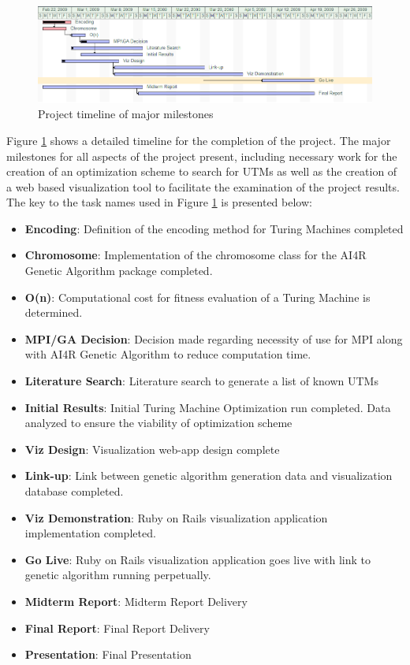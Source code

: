 \begin{figure}[htp]
\centering
\includegraphics[width=1\textwidth]{images/gantt.png}
\caption{Project timeline of major milestones}\label{fig:gantt}
\end{figure}
Figure \ref{fig:gantt} shows a detailed timeline for the completion of the project. The major milestones for all aspects of the project present, including necessary work for the creation of an optimization scheme to search for UTMs as well as the creation of a web based visualization tool to facilitate the examination of the project results. The key to the task names used in Figure \ref{fig:gantt} is presented below: 
\begin{itemize}
	\item {\bf Encoding}:	Definition of the encoding method for Turing Machines completed
	\item {\bf Chromosome}: Implementation of the chromosome class for the AI4R Genetic Algorithm package completed.
	\item {\bf O(n)}:	Computational cost for fitness evaluation of a Turing Machine is determined.
	\item {\bf MPI/GA Decision}:	Decision made regarding necessity of use for MPI along with AI4R\nocite{AI4Rmanual} Genetic Algorithm to reduce computation time.
	\item {\bf Literature Search}: Literature search to generate a list of known UTMs
	\item {\bf Initial Results}: Initial Turing Machine Optimization run completed. Data analyzed to ensure the viability of optimization scheme
	\item {\bf Viz Design}: Visualization web-app design complete
	\item {\bf Link-up}: Link between genetic algorithm generation data and visualization database completed.
	\item {\bf Viz Demonstration}: Ruby on Rails visualization application implementation completed.
	\item {\bf Go Live}: Ruby on Rails visualization application goes live with link to genetic algorithm running perpetually.
	\item {\bf Midterm Report}: Midterm Report Delivery
	\item {\bf Final Report}: Final Report Delivery
	\item {\bf Presentation}:	Final Presentation
\end{itemize}
